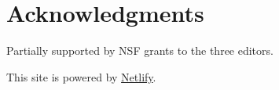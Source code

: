 \section*{Acknowledgments}

Partially supported by NSF grants to the three editors.

\begin{htmlonly}
This site is powered by \href{https://www.netlify.com/}{Netlify}.
\end{htmlonly}
